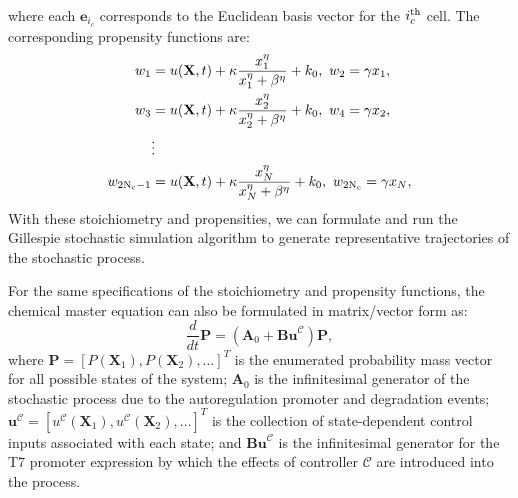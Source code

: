 \documentclass[12pt]{article}
\begin{document}
 
where each $\mathbf{e}_{i_c}$ corresponds to the Euclidean basis vector for the $i_c^{\rm th}$ cell. The corresponding propensity functions are:
\begin{align}
w_1 &= u(\mathbf{X},t)  + \kappa \frac{x_1^\eta}{x_1^{\eta}+\beta^{\eta}} + k_0,\ w_2 = \gamma x_1,\nonumber\\
w_3 &= u(\mathbf{X},t)  + \kappa \frac{x_2^\eta}{x_2^{\eta}+\beta^{\eta}} + k_0,\ w_4 = \gamma x_2,\nonumber\\
&\vdots \nonumber\\
w_{\rm 2N_c-1} &= u(\mathbf{X},t)  + \kappa \frac{x_N^\eta}{x_N^{\eta}+\beta^{\eta}} + k_0,\ w_{\rm 2N_c} = \gamma x_N,\label{Props}
 \end{align}
With these stoichiometry and propensities, we can formulate and run the Gillespie stochastic simulation algorithm\cite{Gillespie1992,Gillespie1977} to generate representative trajectories of the stochastic process.

For the same specifications of the stoichiometry and propensity functions, the chemical master equation can also be formulated in matrix/vector form as:
\begin{equation}
\frac{d}{dt}\mathbf{P}=(\mathbf{A}_0+\textbf{Bu}^{\mathcal{C}})\mathbf{P},\label{CME}
\end{equation}
where $\mathbf{P} = [P(\mathbf{X}_1), P(\mathbf{X}_2), \ldots ]^T$ is the enumerated probability mass vector for all possible states of the system; $\mathbf{A}_0$ is the infinitesimal generator of the stochastic process due to the autoregulation promoter and degradation events;  $\textbf{u}^{\mathcal{C}} =[u^{\mathcal{C}}(\mathbf{X}_1), u^{\mathcal{C}}(\mathbf{X}_2), \ldots ]^T$ is the collection of state-dependent control inputs associated with each state; and $\textbf{Bu}^{\mathcal{C}}$ is the infinitesimal generator for the T7 promoter expression by which the effects of controller $\mathcal{C}$ are introduced into the process. 
\end{document}
